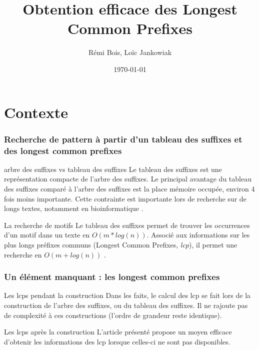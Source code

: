 \documentclass[10pt]{beamer}
\title{Obtention efficace des Longest Common Prefixes}
\author{Rémi Bois, Loïc Jankowiak}
\date{\today}
\begin{document}
\begin{frame}
  \maketitle

\end{frame}

\begin{frame}
  \tableofcontents
\end{frame}

\section{Contexte}
\label{sec:context}


\begin{frame}
  \frametitle{Recherche de pattern à partir d'un tableau des suffixes
    et des longest common prefixes}

  \begin{block}{arbre des suffixes vs tableau des suffixes} 
    Le tableau des suffixes est une représentation compacte de l'arbre
    des suffixes. Le principal avantage du tableau des suffixes comparé à
    l'arbre des suffixes est la place mémoire occupée, environ 4 fois
    moins importante. Cette contrainte est importante lors de
    recherche sur de longs textes, notamment en bioinformatique \cite{Raffinot11}.
  \end{block}

  \pause

  \begin{block}{La recherche de motifs}
    Le tableau des suffixes permet de trouver les occurrences d'un
    motif dans un texte en $O(m*log(n))$. Associé aux informations sur
    les plus longs préfixes communs (Longest Common Prefixes,
    \emph{lcp}), il permet une recherche en $O(m + log(n))$ \cite{Manber93}.
  \end{block}
  
\end{frame}

\begin{frame}
  \frametitle{Un élément manquant : les longest common prefixes}

  \begin{block}{Les lcps pendant la construction}
      Dans les faits, le calcul des lcp se fait lors de la construction de
      l'arbre des suffixes, ou du tableau des suffixes. Il ne rajoute pas
      de complexité à ces constructions (l'ordre de grandeur reste
      identique).
  \end{block}
  \pause
  \begin{block}{Les lcps après la construction}
    L'article présenté propose un moyen efficace d'obtenir
    les informations des lcp lorsque celles-ci ne sont pas
    disponibles\cite{Kasai01}.
  \end{block}

\end{frame}
\end{document}

